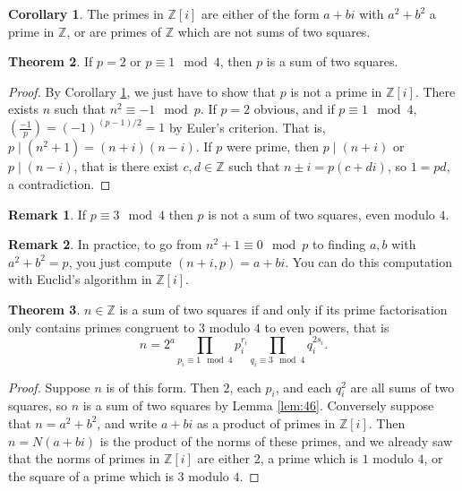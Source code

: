 \documentclass{article}
\newcommand{\Z}{\mathbb{Z}}
\newcommand{\rb}[1]{\left( #1 \right)}
\renewcommand{\sb}[1]{\left[ #1 \right]}
\newcommand{\legendre}[2]{\rb{\tfrac{#1}{#2}}}
\theoremstyle{definition}\newtheorem{definition}{Definition}
\theoremstyle{definition}\newtheorem*{remark}{Remark}
\theoremstyle{definition}\newtheorem*{example}{Example}
\theoremstyle{definition}\newtheorem*{note}{Note}
\newtheorem{theorem}[definition]{Theorem}
\newtheorem{corollary}[definition]{Corollary}
\begin{document}
\begin{corollary}
\label{cor:50}
The primes in $ \Z\sb{i} $ are either of the form $ a + bi $ with $ a^2 + b^2 $ a prime in $ \Z $, or are primes of $ \Z $ which are not sums of two squares.
\end{corollary}

\begin{theorem}
If $ p = 2 $ or $ p \equiv 1 \mod 4 $, then $ p $ is a sum of two squares.
\end{theorem}

\begin{proof}
By Corollary \ref{cor:50}, we just have to show that $ p $ is not a prime in $ \Z\sb{i} $. There exists $ n $ such that $ n^2 \equiv -1 \mod p $. If $ p = 2 $ obvious, and if $ p \equiv 1 \mod 4 $, $ \legendre{-1}{p} = \rb{-1}^{\rb{p - 1} / 2} = 1 $ by Euler's criterion. That is, $ p \mid \rb{n^2 + 1} = \rb{n + i}\rb{n - i} $. If $ p $ were prime, then $ p \mid \rb{n + i} $ or $ p \mid \rb{n - i} $, that is there exist $ c, d \in \Z $ such that $ n \pm i = p\rb{c + di} $, so $ 1 = pd $, a contradiction.
\end{proof}

\begin{remark}
If $ p \equiv 3 \mod 4 $ then $ p $ is not a sum of two squares, even modulo $ 4 $.
\end{remark}

\begin{remark}
In practice, to go from $ n^2 + 1 \equiv 0 \mod p $ to finding $ a, b $ with $ a^2 + b^2 = p $, you just compute $ \rb{n + i, p} = a + bi $. You can do this computation with Euclid's algorithm in $ \Z\sb{i} $.
\end{remark}

\begin{theorem}
$ n \in \Z $ is a sum of two squares if and only if its prime factorisation only contains primes congruent to $ 3 $ modulo $ 4 $ to even powers, that is
$$ n = 2^a\prod_{p_i \equiv 1 \mod 4} p_i^{r_i}\prod_{q_i \equiv 3 \mod 4} q_i^{2s_i}. $$
\end{theorem}

\begin{proof}
Suppose $ n $ is of this form. Then $ 2 $, each $ p_i $, and each $ q_i^2 $ are all sums of two squares, so $ n $ is a sum of two squares by Lemma \ref{lem:46}. Conversely suppose that $ n = a^2 + b^2 $, and write $ a + bi $ as a product of primes in $ \Z\sb{i} $. Then $ n = N\rb{a + bi} $ is the product of the norms of these primes, and we already saw that the norms of primes in $ \Z\sb{i} $ are either $ 2 $, a prime which is $ 1 $ modulo $ 4 $, or the square of a prime which is $ 3 $ modulo $ 4 $.
\end{proof}
\end{document}
